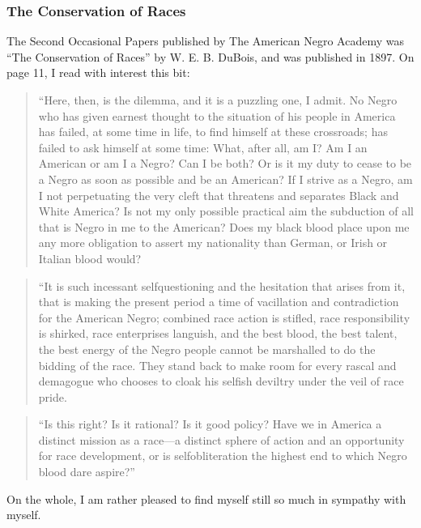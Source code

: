 \documentclass[letterpaper,10pt,english]{jupyterBook}
\begin{document}
\subsubsection{The Conservation of Races}
\label{\detokenize{Volumes/41/06/counsels_of_despair:the-conservation-of-races}}
\sphinxAtStartPar
The Second Occasional Papers published by The American Negro Academy was “The Conservation of Races” by W. E. B. DuBois, and was published in 1897. On page 11, I read with interest this bit:
\begin{quote}

\sphinxAtStartPar
“Here, then, is the dilemma, and it is a puzzling one, I admit. No Negro who has given earnest thought to the situation of his people in America has failed, at some time in life, to find himself at these cross\sphinxhyphen{}roads; has failed to ask himself at some time: What, after all, am I? Am I an American or am I a Negro? Can I be both? Or is it my duty to cease to be a Negro as soon as possible and be an American? If I strive as a Negro, am I not perpetuating the very cleft that threatens and separates Black and White America? Is not my only possible practical aim the subduction of all that is Negro in me to the American? Does my black blood place upon me any more obligation to assert my nationality than German, or Irish or Italian blood would?
\end{quote}
\begin{quote}

\sphinxAtStartPar
“It is such incessant self\sphinxhyphen{}questioning and the hesitation that arises from it, that is making the present period a time of vacillation and contradiction for the American Negro; combined race action is stifled, race responsibility is shirked, race enterprises languish, and the best blood, the best talent, the best energy of the Negro people cannot be marshalled to do the bidding of the race. They stand back to make room for every rascal and demagogue who chooses to cloak his selfish deviltry under the veil of race pride.
\end{quote}
\begin{quote}

\sphinxAtStartPar
“Is this right? Is it rational? Is it good policy? Have we in America a distinct mission as a race—a distinct sphere of action and an opportunity for race development, or is self\sphinxhyphen{}obliteration the highest end to which Negro blood dare aspire?”
\end{quote}

\sphinxAtStartPar
On the whole, I am rather pleased to find myself still so much in sympathy with myself.
\end{document}
